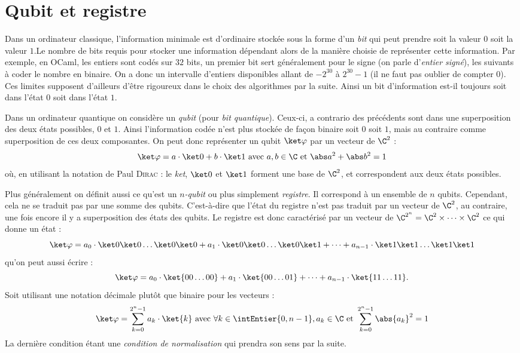 \documentclass[a4paper,11pt]{tipe}
\begin{document}
\section{Qubit et registre}
Dans un ordinateur classique, l'information minimale est d'ordinaire stockée
sous la forme d'un \emph{bit} qui peut prendre soit la valeur $0$ soit la
valeur $1$.Le nombre de bits requis pour stocker une information dépendant alors
de la manière choisie de représenter cette information. Par exemple, en OCaml,
les entiers sont codés sur $32$ bits, un premier bit sert généralement pour le
signe (on parle d'\emph{entier signé}), les suivants à coder le nombre en
binaire. On a donc un intervalle d'entiers disponibles allant de $-2^{30}$ à
$2^{30} - 1$ (il ne faut pas oublier de compter $0$). Ces limites supposent
d'ailleurs d'être rigoureux dans le choix des algorithmes par la suite. Ainsi un
bit d'information est-il toujours soit dans l'état $0$ soit dans l'état $1$.

Dans un ordinateur quantique on considère un \emph{qubit} (pour \emph{bit
quantique}). Ceux-ci, a contrario des précédents sont dans une superposition
des deux états possibles, $0$ et $1$. Ainsi l'information codée n'est plus
stockée de façon binaire soit $0$ soit $1$, mais au contraire comme
superposition de ces deux composantes. On peut donc représenter un qubit
$\ket \varphi$ par un vecteur de $\C^2$ :
\[ \ket \varphi = a \cdot \ket 0 + b \cdot \ket 1 \text{ avec } a,b\in\C \text{
et } \abs a ^2 + \abs b ^2 = 1 \]
où, en utilisant la notation de Paul \textsc{Dirac} : le \emph{ket}, $\ket 0$ et
$\ket 1$ forment une base de $\C^2$, et correspondent aux deux états possibles. 

Plus généralement on définit aussi ce qu'est un \emph{$n$-qubit} ou plus
simplement \emph{registre}. Il correspond à un ensemble de $n$ qubits.
Cependant, cela ne se traduit pas par une somme des qubits. C'est-à-dire que
l'état du registre n'est pas traduit par un vecteur de $\C^2$, au contraire,
une fois encore il y a superposition des états des qubits. Le registre est donc
caractérisé par un vecteur de $\C^{2^n} = \C^2 \times \dots \times \C^2$ ce qui
donne un état :
\[ \ket\varphi = a_0 \cdot \ket 0 \ket 0 \dots \ket 0 \ket 0
    + a_1 \cdot \ket 0 \ket 0 \dots \ket 0 \ket 1 
    + \dots + a_{n-1} \cdot \ket 1 \ket 1\dots \ket 1 \ket 1 \]
qu'on peut aussi écrire :
\[ \ket\varphi = a_0 \cdot \ket{00\dots00}
    + a_1 \cdot \ket{00\dots01} + \dots 
    + a_{n-1} \cdot\ket{11\dots11} .\]
Soit utilisant une notation décimale plutôt que binaire pour les vecteurs :
\[\ket\varphi = \sum_{k=0}^{2^n-1} a_k \cdot \ket {k} \text{ avec } \forall k
\in \intEntier{0,n-1} , a_k \in\C \text{ et } \sum_{k=0}^{2^n-1} \abs{a_k} ^2 =
1 \]
La dernière condition étant une \emph{condition de normalisation} qui prendra
son sens par la suite.
\end{document}

